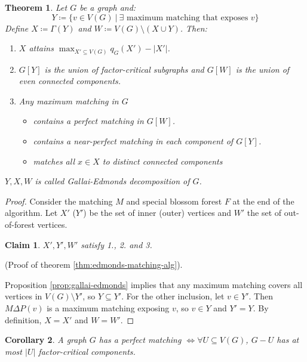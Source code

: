 \documentclass[11pt, a4paper]{article}
\newcommand{\abs}[1]{\left\lvert#1\right\rvert}
\newcommand{\set}[1]{\{#1\}}
\newtheorem{theorem}{Theorem}[section]
\newtheorem{cor}[theorem]{Corollary}
\newtheorem*{claim}{Claim}
\theoremstyle{remark}
\theoremstyle{definition}
\begin{document}
\begin{theorem}
Let $G$ be a graph and:
\[
	Y\coloneqq\set{v\in V(G)\ |\ 
	\exists \text{ maximum matching that exposes } v}
\]
Define $X\coloneqq\Gamma(Y)$ and
$W\coloneqq V(G)\setminus \left(X\cup Y\right)$. Then:
\begin{enumerate}
	\item $X$ attains $\max_{X'\subseteq V(G)}q_G(X')-\abs{X'}$.
	\item $G[Y]$ is the union of factor-critical subgraphs and
	$G[W]$ is the union of even connected components.
	\item Any maximum matching in $G$
	\begin{itemize}
		\item contains a perfect matching in $G[W]$.
		\item contains a near-perfect matching in each component of $G[Y]$.
		\item matches all $x\in X$ to distinct connected components
	\end{itemize}
\end{enumerate}
$Y,X,W$ is called \emph{Gallai-Edmonds decomposition} of $G$.
\end{theorem}
\begin{proof}
Consider the matching $M$ and special blossom forest $F$ at the end
of the algorithm. Let $X'$ ($Y'$) be the set of inner (outer) vertices
and $W'$ the set of out-of-forest vertices.
\begin{claim}
$X',Y',W'$ satisfy 1., 2. and 3.
\end{claim}
(Proof of theorem \ref{thm:edmonds-matching-alg}).

Proposition \ref{prop:gallai-edmonds} implies that any maximum matching
covers all vertices in $V(G)\setminus Y'$, so $Y\subseteq Y'$. For
the other inclusion, let $v\in Y'$. Then $M\Delta P(v)$ is a maximum
matching exposing $v$, so $v\in Y$ and $Y'=Y$. By definition, $X=X'$
and $W=W'$.
\end{proof}

\begin{cor}
A graph $G$ has a perfect matching $\Leftrightarrow \forall U\subseteq V(G)$,
$G-U$ has at most $\abs{U}$ factor-critical components.
\end{cor}
\end{document}
